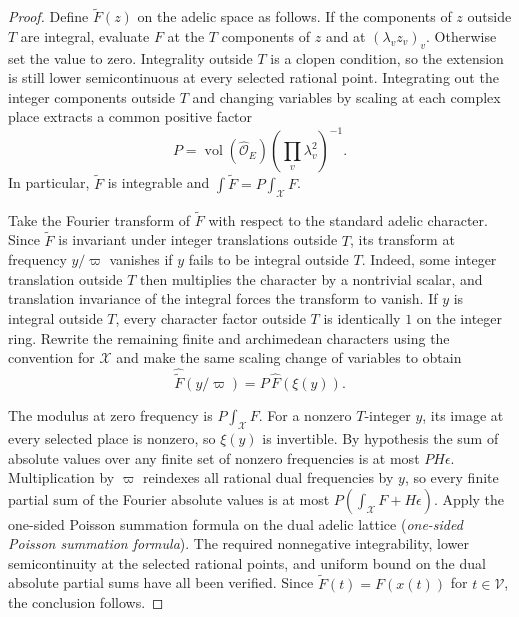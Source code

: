 \begin{proof}
Define $\widetilde F(z)$ on the adelic space as follows.
If the components of $z$ outside $T$ are integral, evaluate $F$ at the $T$ components of $z$ and at
$(\lambda_v z_v)_v$. Otherwise set the value to zero.
Integrality outside $T$ is a clopen condition, so the extension is still lower semicontinuous at every selected rational point.
Integrating out the integer components outside $T$ and changing variables by scaling at each complex place extracts a common positive factor
\[
 P=\operatorname{vol}(\widehat{\mathcal O}_E)\left(\prod_v\lambda_v^2\right)^{-1}.
\]
In particular, $\widetilde F$ is integrable and $\int\widetilde F=P\int_{\mathcal X}F$.

Take the Fourier transform of $\widetilde F$ with respect to the standard adelic character.
Since $\widetilde F$ is invariant under integer translations outside $T$,
its transform at frequency $y/\varpi$ vanishes if $y$ fails to be integral outside $T$.
Indeed, some integer translation outside $T$ then multiplies the character by a nontrivial scalar,
and translation invariance of the integral forces the transform to vanish.
If $y$ is integral outside $T$, every character factor outside $T$ is identically $1$ on the integer ring.
Rewrite the remaining finite and archimedean characters using the convention for $\mathcal X$
and make the same scaling change of variables to obtain
\[
 \widehat{\widetilde F}(y/\varpi)=P\,\widehat F(\xi(y)).
\]

The modulus at zero frequency is $P\int_{\mathcal X}F$.
For a nonzero $T$-integer $y$, its image at every selected place is nonzero,
so $\xi(y)$ is invertible. By hypothesis the sum of absolute values over any finite set of nonzero frequencies is at most
$PH\epsilon$. Multiplication by $\varpi$ reindexes all rational dual frequencies by $y$,
so every finite partial sum of the Fourier absolute values is at most
$P(\int_{\mathcal X}F+H\epsilon)$.
Apply the one-sided Poisson summation formula on the dual adelic lattice (\emph{one-sided Poisson summation formula}).
The required nonnegative integrability, lower semicontinuity at the selected rational points, and uniform bound on the dual absolute partial sums have all been verified.
Since $\widetilde F(t)=F(x(t))$ for $t\in\mathcal V$, the conclusion follows.
\end{proof}

